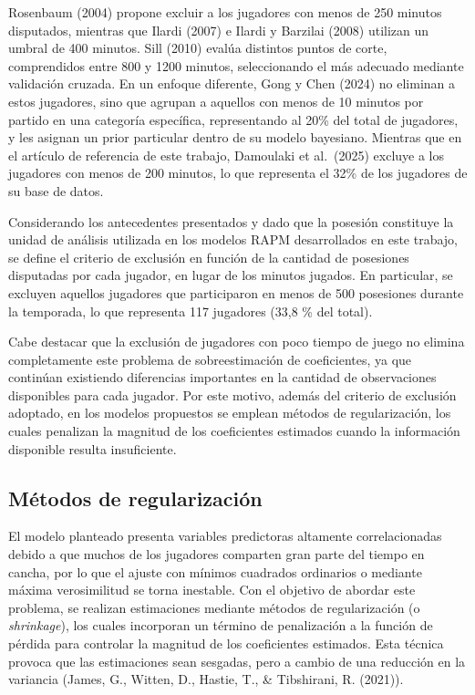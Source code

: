\documentclass[
  12pt,
]{article}
\begin{document}
Rosenbaum (2004) propone excluir a los jugadores con menos de 250
minutos disputados, mientras que Ilardi (2007) e Ilardi y Barzilai
(2008) utilizan un umbral de 400 minutos. Sill (2010) evalúa distintos
puntos de corte, comprendidos entre 800 y 1200 minutos, seleccionando el
más adecuado mediante validación cruzada. En un enfoque diferente, Gong
y Chen (2024) no eliminan a estos jugadores, sino que agrupan a aquellos
con menos de 10 minutos por partido en una categoría específica,
representando al 20\% del total de jugadores, y les asignan un prior
particular dentro de su modelo bayesiano. Mientras que en el artículo de
referencia de este trabajo, Damoulaki et al.~(2025) excluye a los
jugadores con menos de 200 minutos, lo que representa el 32\% de los
jugadores de su base de datos.

Considerando los antecedentes presentados y dado que la posesión
constituye la unidad de análisis utilizada en los modelos RAPM
desarrollados en este trabajo, se define el criterio de exclusión en
función de la cantidad de posesiones disputadas por cada jugador, en
lugar de los minutos jugados. En particular, se excluyen aquellos
jugadores que participaron en menos de 500 posesiones durante la
temporada, lo que representa 117 jugadores (33,8 \% del total).

Cabe destacar que la exclusión de jugadores con poco tiempo de juego no
elimina completamente este problema de sobreestimación de coeficientes,
ya que continúan existiendo diferencias importantes en la cantidad de
observaciones disponibles para cada jugador. Por este motivo, además del
criterio de exclusión adoptado, en los modelos propuestos se emplean
métodos de regularización, los cuales penalizan la magnitud de los
coeficientes estimados cuando la información disponible resulta
insuficiente.

\subsection{Métodos de
regularización}\label{muxe9todos-de-regularizaciuxf3n}

El modelo planteado presenta variables predictoras altamente
correlacionadas debido a que muchos de los jugadores comparten gran
parte del tiempo en cancha, por lo que el ajuste con mínimos cuadrados
ordinarios o mediante máxima verosimilitud se torna inestable. Con el
objetivo de abordar este problema, se realizan estimaciones mediante
métodos de regularización (o \emph{shrinkage}), los cuales incorporan un
término de penalización a la función de pérdida para controlar la
magnitud de los coeficientes estimados. Esta técnica provoca que las
estimaciones sean sesgadas, pero a cambio de una reducción en la
variancia (James, G., Witten, D., Hastie, T., \& Tibshirani, R. (2021)).
\end{document}

